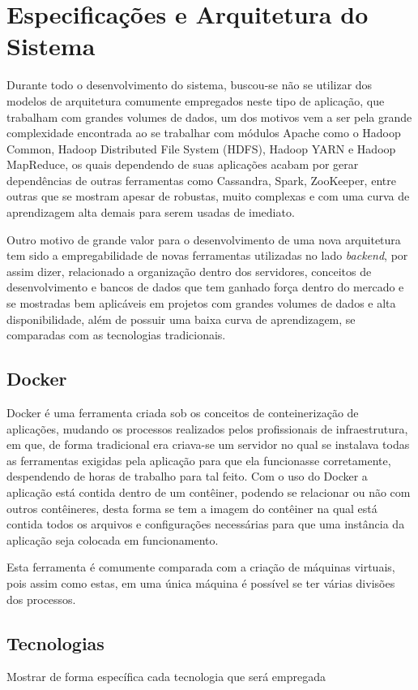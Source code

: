 \chapter{Especificações e Arquitetura do Sistema}
\label{chap:arquitetura}
Durante todo o desenvolvimento do sistema, buscou-se não se utilizar dos modelos de arquitetura comumente empregados neste tipo de aplicação, que trabalham com grandes volumes de dados, um dos motivos vem a ser pela grande complexidade encontrada ao se trabalhar com módulos Apache como o Hadoop Common, Hadoop Distributed File System (HDFS), Hadoop YARN e Hadoop MapReduce, os quais dependendo de suas aplicações acabam por gerar dependências de outras ferramentas como Cassandra, Spark, ZooKeeper, entre outras que se mostram apesar de robustas, muito complexas e com uma curva de aprendizagem alta demais para serem usadas de imediato.

Outro motivo de grande valor para o desenvolvimento de uma nova arquitetura tem sido a empregabilidade de novas ferramentas utilizadas no lado \textit{backend}, por assim dizer, relacionado a organização dentro dos servidores, conceitos de desenvolvimento e bancos de dados que tem ganhado força dentro do mercado e se mostradas bem aplicáveis em projetos com grandes volumes de dados e alta disponibilidade, além de possuir uma baixa curva de aprendizagem, se comparadas com as tecnologias tradicionais.

\section{Docker}
\label{sec:docker}
Docker é uma ferramenta criada sob os conceitos de conteinerização de aplicações, mudando os processos realizados pelos profissionais de infraestrutura, em que, de forma tradicional era criava-se um servidor no qual se instalava todas as ferramentas exigidas pela aplicação para que ela funcionasse corretamente, despendendo de horas de trabalho para tal feito. Com o uso do Docker a aplicação está contida dentro de um contêiner, podendo se relacionar ou não com outros contêineres, desta forma se tem a imagem do contêiner na qual está contida todos os arquivos e configurações necessárias para que uma instância da aplicação seja colocada em funcionamento.

Esta ferramenta é comumente comparada com a criação de máquinas virtuais, pois assim como estas, em uma única máquina é possível se ter várias divisões dos processos.

\section{Tecnologias}
\label{sec:tecnologias}
Mostrar de forma específica cada tecnologia que será empregada

